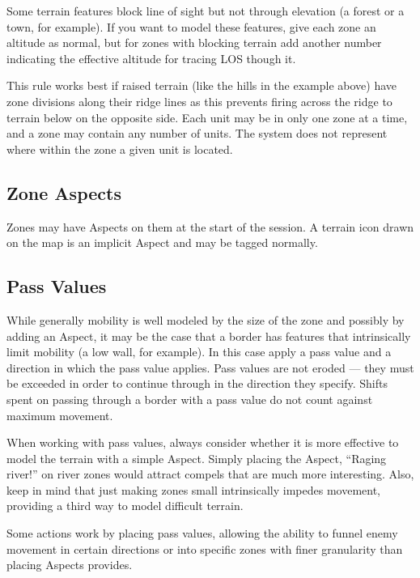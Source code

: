 Some terrain features block line of sight but not through elevation (a forest or a town, for example). If you want to model these features, give each zone an altitude as normal, but for zones with blocking terrain add another number indicating the effective altitude for tracing LOS though it.

This rule works best if raised terrain (like the hills in the example above) have zone divisions along their ridge lines as this prevents firing across the ridge to terrain below on the opposite side. Each unit may be in only one zone at a time, and a zone may contain any number of units. The system does not represent where within the zone a given unit is located.


\subsection{Zone Aspects}
\label{sec:platoon-combat-zone-aspects}

Zones may have Aspects on them at the start of the session. A terrain icon drawn on the map is an implicit Aspect and may be tagged normally.

\subsection{Pass Values}
\label{sec:platoon-combat-pass-values}

While generally mobility is well modeled by the size of the zone and possibly by adding an Aspect, it may be the case that a border has features that intrinsically limit mobility (a low wall, for example). In this case apply a pass value and a direction in which the pass value applies. Pass values are not eroded --- they must be exceeded in order to continue through in the direction they specify. Shifts spent on passing through a border with a pass value do not count against maximum movement.

When working with pass values, always consider whether it is more effective to model the terrain with a simple Aspect. Simply placing the Aspect, ``Raging river!'' on river zones would attract compels that are much more interesting. Also, keep in mind that just making zones small intrinsically impedes movement, providing a third way to model difficult terrain.

Some actions work by placing pass values, allowing the ability to funnel enemy movement in certain directions or into specific zones with finer granularity than placing Aspects provides.

